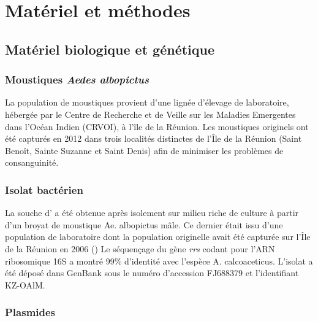 \chapter{Matériel et méthodes}

\section{Matériel biologique et génétique}

\subsection{Moustiques \textit{Aedes albopictus}}
\label{par:moustiques}
La population de moustiques  provient d'une lignée d'élevage de laboratoire, hébergée par le Centre de Recherche et de Veille sur les Maladies Emergentes dans l'Océan Indien (CRVOI), à l'île de la Réunion.
Les moustiques originels ont été capturés en 2012 dans trois localités distinctes de l'Île de la Réunion (Saint Benoît, Sainte Suzanne et Saint Denis) afin de minimiser les problèmes de consanguinité.

\subsection{Isolat bactérien}
La souche d' a été obtenue après isolement sur milieu riche de culture à partir d'un broyat de moustique Ae. albopictus mâle. Ce dernier était issu d'une population de laboratoire dont la population originelle avait été capturée sur l'Île de la Réunion en 2006 (\textcite{zouache2009})
Le séquençage du gène \textit{rrs} codant pour l'ARN ribosomique 16S a montré 99\% d'identité avec l'espèce A. calcoaceticus. L'isolat a été déposé dans GenBank sous le numéro d'accession FJ688379 et l'identifiant KZ-OAlM.

\subsection{Plasmides}

